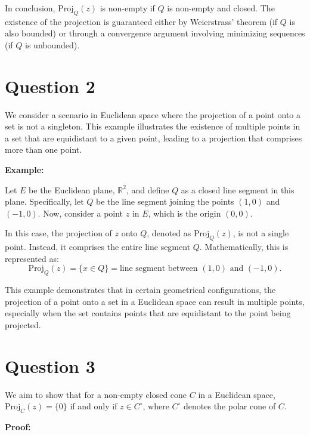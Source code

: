 \documentclass[12p]{article}
\begin{document}
In conclusion, \( \text{Proj}_Q(z) \) is non-empty if \( Q \) is non-empty and closed. The existence of the projection is guaranteed either by Weierstrass' theorem (if \( Q \) is also bounded) or through a convergence argument involving minimizing sequences (if \( Q \) is unbounded).



\section*{Question 2} 
We consider a scenario in Euclidean space where the projection of a point onto a set is not a singleton. This example illustrates the existence of multiple points in a set that are equidistant to a given point, leading to a projection that comprises more than one point.

\textbf{Example:}

Let \( E \) be the Euclidean plane, \( \mathbb{R}^2 \), and define \( Q \) as a closed line segment in this plane. Specifically, let \( Q \) be the line segment joining the points \( (1,0) \) and \( (-1,0) \). Now, consider a point \( z \) in \( E \), which is the origin \( (0,0) \).

In this case, the projection of \( z \) onto \( Q \), denoted as \( \text{Proj}_Q(z) \), is not a single point. Instead, it comprises the entire line segment \( Q \). Mathematically, this is represented as:
\begin{equation}
    \text{Proj}_Q(z) = \{ x \in Q \} = \text{line segment between } (1,0) \text{ and } (-1,0).
\end{equation}

This example demonstrates that in certain geometrical configurations, the projection of a point onto a set in a Euclidean space can result in multiple points, especially when the set contains points that are equidistant to the point being projected.


\section*{Question 3} 
We aim to show that for a non-empty closed cone \( C \) in a Euclidean space, \( \text{Proj}_C(z) = \{0\} \) if and only if \( z \in C^\circ \), where \( C^\circ \) denotes the polar cone of \( C \).

\textbf{Proof:}
\end{document}
